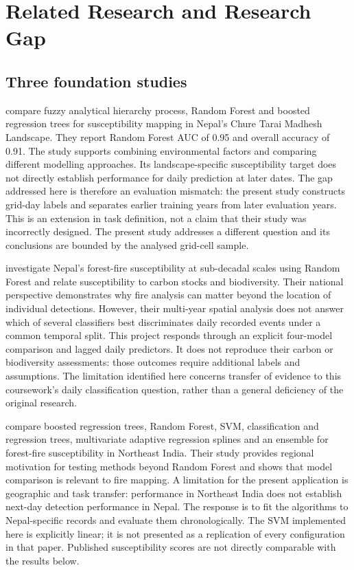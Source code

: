 \documentclass[conference,a4paper]{IEEEtran}
\begin{document}
\section{Related Research and Research Gap}
\subsection{Three foundation studies}
\citet{dhakal} compare fuzzy analytical hierarchy process, Random Forest and boosted regression trees for susceptibility mapping in Nepal's Chure Tarai Madhesh Landscape. They report Random Forest AUC of 0.95 and overall accuracy of 0.91. The study supports combining environmental factors and comparing different modelling approaches. Its landscape-specific susceptibility target does not directly establish performance for daily prediction at later dates. The gap addressed here is therefore an evaluation mismatch: the present study constructs grid-day labels and separates earlier training years from later evaluation years. This is an extension in task definition, not a claim that their study was incorrectly designed. The present study addresses a different question and its conclusions are bounded by the analysed grid-cell sample.

\citet{dahal} investigate Nepal's forest-fire susceptibility at sub-decadal scales using Random Forest and relate susceptibility to carbon stocks and biodiversity. Their national perspective demonstrates why fire analysis can matter beyond the location of individual detections. However, their multi-year spatial analysis does not answer which of several classifiers best discriminates daily recorded events under a common temporal split. This project responds through an explicit four-model comparison and lagged daily predictors. It does not reproduce their carbon or biodiversity assessments: those outcomes require additional labels and assumptions. The limitation identified here concerns transfer of evidence to this coursework's daily classification question, rather than a general deficiency of the original research.

\citet{sarkar} compare boosted regression trees, Random Forest, SVM, classification and regression trees, multivariate adaptive regression splines and an ensemble for forest-fire susceptibility in Northeast India. Their study provides regional motivation for testing methods beyond Random Forest and shows that model comparison is relevant to fire mapping. A limitation for the present application is geographic and task transfer: performance in Northeast India does not establish next-day detection performance in Nepal. The response is to fit the algorithms to Nepal-specific records and evaluate them chronologically. The SVM implemented here is explicitly linear; it is not presented as a replication of every configuration in that paper. Published susceptibility scores are not directly comparable with the results below.
\end{document}
